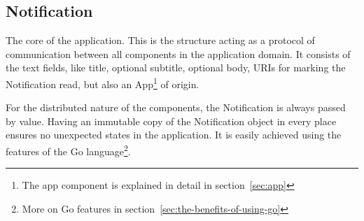 \subsection{Notification}\label{sec:notification}

The core of the application.
This is the structure
acting as a protocol of communication
between all components in the application domain.
It consists of the text fields,
like title, optional subtitle, optional body,
URIs for marking the Notification read,
but also an App\footnote{
  The app component is explained in detail in section~\ref{sec:app}
} of origin.

For the distributed nature of the components,
the Notification is always passed by value.
Having an immutable copy of the Notification object
in every place ensures
no unexpected states in the application.
It is easily achieved
using the features of
the Go language\footnote{
  More on Go features in section~\ref{sec:the-benefits-of-using-go}
}.
